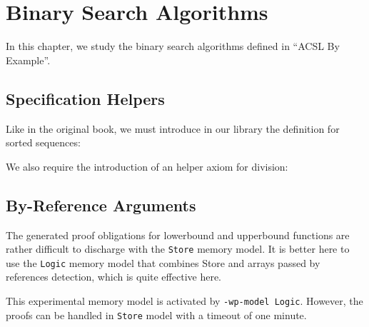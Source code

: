 \chapter{Binary Search Algorithms}
\label{binary}

In this chapter, we study the binary search algorithms defined in ``ACSL By Example''.

\section{Specification Helpers}
\label{binary-helpers}
Like in the original book, we must introduce in our library the
definition for sorted sequences:


We also require the introduction of an helper axiom for division:


\section{By-Reference Arguments}
The generated proof obligations for lowerbound and upperbound functions
are rather difficult to discharge with the \texttt{Store} memory model.
It is better here to use the \texttt{Logic} memory model that combines \textsf{Store}
and arrays passed by references detection, which is quite effective here.

This experimental memory model is activated by \texttt{-wp-model Logic}. However,
the proofs can be handled in \texttt{Store} model with a timeout of one minute.




